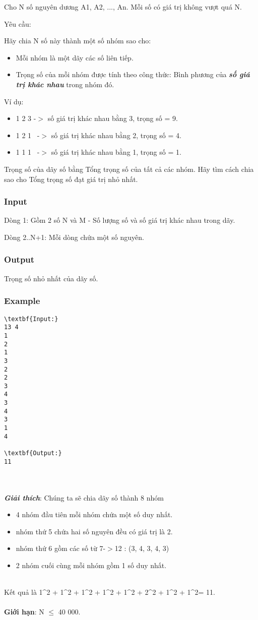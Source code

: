 

Cho N số nguyên dương A1, A2, ..., An. Mỗi số có giá trị không vượt quá N.

Yêu cầu:

Hãy chia N số này thành một số nhóm sao cho:
\begin{itemize}
	\item Mỗi nhóm là một dãy các số liên tiếp.
	\item Trọng số của mỗi nhóm được tính theo công thức: Bình phương của \textbf{\emph{ số giá trị khác nhau }} trong nhóm đó.
\end{itemize}

Ví dụ:
\begin{itemize}
	\item 1 2 3 -$>$ số giá trị khác nhau bằng 3, trọng số = 9.
	\item 1 2 1  -$>$ số giá trị khác nhau bằng 2, trọng số = 4.
	\item 1 1 1  -$>$ số giá trị khác nhau bằng 1, trọng số = 1.
\end{itemize}

Trọng số của dãy số bằng Tổng trọng số của tất cả các nhóm. Hãy tìm cách chia sao cho Tổng trọng số đạt giá trị nhỏ nhất.

\subsubsection{Input}

Dòng 1: Gồm 2 số N và M - Số lượng số và số giá trị khác nhau trong dãy.

Dòng 2..N+1: Mỗi dòng chứa một số nguyên.

\subsubsection{Output}

Trọng số nhỏ nhất của dãy số.

\subsubsection{Example}
\begin{verbatim}
\textbf{Input:}
13 4
1
2
1
3
2
2
3
4
3
4
3
1
4

\textbf{Output:}
11\end{verbatim}


\\
\\\textbf{\emph{Giải thích}}: Chúng ta sẽ chia dãy số thành 8 nhóm
\begin{itemize}
	\item 4 nhóm đầu tiên mỗi nhóm chứa một số duy nhất.
	\item nhóm thứ 5 chứa hai số nguyên đều có giá trị là 2.
	\item nhóm thứ 6 gồm các số từ 7-$>$12 : (3, 4, 3, 4, 3)
	\item 2 nhóm cuối cùng mỗi nhóm gồm 1 số duy nhất.
\end{itemize}


\\Kết quả là 1\textasciicircum2 + 1\textasciicircum2 + 1\textasciicircum2 + 1\textasciicircum2 + 1\textasciicircum2 + 2\textasciicircum2 + 1\textasciicircum2 + 1\textasciicircum2= 11.
\\
\\\textbf{Giới hạn}: N  $\le$  40 000.
